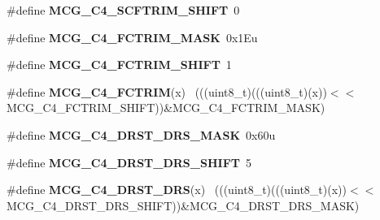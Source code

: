 \begin{DoxyCompactItemize}
\item 
\hypertarget{group___m_c_g___register___masks_ga1114052674119b01137ef4b4885ab757}{}\#define {\bfseries M\+C\+G\+\_\+\+C4\+\_\+\+S\+C\+F\+T\+R\+I\+M\+\_\+\+S\+H\+I\+F\+T}~0\label{group___m_c_g___register___masks_ga1114052674119b01137ef4b4885ab757}

\item 
\hypertarget{group___m_c_g___register___masks_ga91610035649d14c5027419db0bfa3231}{}\#define {\bfseries M\+C\+G\+\_\+\+C4\+\_\+\+F\+C\+T\+R\+I\+M\+\_\+\+M\+A\+S\+K}~0x1\+Eu\label{group___m_c_g___register___masks_ga91610035649d14c5027419db0bfa3231}

\item 
\hypertarget{group___m_c_g___register___masks_ga0a1b1f2be0b8e9afc3ff91ab11d71a1e}{}\#define {\bfseries M\+C\+G\+\_\+\+C4\+\_\+\+F\+C\+T\+R\+I\+M\+\_\+\+S\+H\+I\+F\+T}~1\label{group___m_c_g___register___masks_ga0a1b1f2be0b8e9afc3ff91ab11d71a1e}

\item 
\hypertarget{group___m_c_g___register___masks_gae3b32644a70a2a5bf1a36f8dc0c09837}{}\#define {\bfseries M\+C\+G\+\_\+\+C4\+\_\+\+F\+C\+T\+R\+I\+M}(x)                                              ~(((uint8\+\_\+t)(((uint8\+\_\+t)(x))$<$$<$M\+C\+G\+\_\+\+C4\+\_\+\+F\+C\+T\+R\+I\+M\+\_\+\+S\+H\+I\+F\+T))\&M\+C\+G\+\_\+\+C4\+\_\+\+F\+C\+T\+R\+I\+M\+\_\+\+M\+A\+S\+K)\label{group___m_c_g___register___masks_gae3b32644a70a2a5bf1a36f8dc0c09837}

\item 
\hypertarget{group___m_c_g___register___masks_ga7f6629e8d17efb2cec3d2f63d09ede5a}{}\#define {\bfseries M\+C\+G\+\_\+\+C4\+\_\+\+D\+R\+S\+T\+\_\+\+D\+R\+S\+\_\+\+M\+A\+S\+K}~0x60u\label{group___m_c_g___register___masks_ga7f6629e8d17efb2cec3d2f63d09ede5a}

\item 
\hypertarget{group___m_c_g___register___masks_ga27d4baa0c8a770f1f67ab47e6407e948}{}\#define {\bfseries M\+C\+G\+\_\+\+C4\+\_\+\+D\+R\+S\+T\+\_\+\+D\+R\+S\+\_\+\+S\+H\+I\+F\+T}~5\label{group___m_c_g___register___masks_ga27d4baa0c8a770f1f67ab47e6407e948}

\item 
\hypertarget{group___m_c_g___register___masks_ga4cba7b614163bf1244629a1006509c37}{}\#define {\bfseries M\+C\+G\+\_\+\+C4\+\_\+\+D\+R\+S\+T\+\_\+\+D\+R\+S}(x)                                          ~(((uint8\+\_\+t)(((uint8\+\_\+t)(x))$<$$<$M\+C\+G\+\_\+\+C4\+\_\+\+D\+R\+S\+T\+\_\+\+D\+R\+S\+\_\+\+S\+H\+I\+F\+T))\&M\+C\+G\+\_\+\+C4\+\_\+\+D\+R\+S\+T\+\_\+\+D\+R\+S\+\_\+\+M\+A\+S\+K)\label{group___m_c_g___register___masks_ga4cba7b614163bf1244629a1006509c37}


\end{DoxyCompactItemize}
